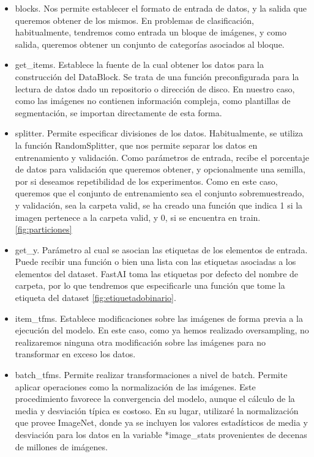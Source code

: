 \begin{itemize}
	\item blocks. Nos permite establecer el formato de entrada de datos, y la salida que queremos obtener de los mismos. En problemas de clasificación, habitualmente, tendremos como entrada un bloque de imágenes, y como salida, queremos obtener un conjunto de categorías asociados al bloque.
	\item get\_items. Establece la fuente de la cual obtener los datos para la construcción del DataBlock. Se trata de una función preconfigurada para la lectura de datos dado un repositorio o dirección de disco. En nuestro caso, como las imágenes no contienen información compleja, como plantillas de segmentación, se importan directamente de esta forma.
	\item splitter. Permite especificar divisiones de los datos. Habitualmente, se utiliza la función RandomSplitter, que nos permite separar los datos en entrenamiento y validación. Como parámetros de entrada, recibe el porcentaje de datos para validación que queremos obtener, y opcionalmente una semilla, por si deseamos repetibilidad de los experimentos. Como en este caso, queremos que el conjunto de entrenamiento sea el conjunto sobremuestreado, y validación, sea la carpeta valid, se ha creado una función que indica 1 si la imagen pertenece a la carpeta valid, y 0, si se encuentra en train. \ref{fig:particiones}
	\item get\_y. Parámetro al cual se asocian las etiquetas de los elementos de entrada. Puede recibir una función o bien una lista con las etiquetas asociadas a los elementos del dataset. FastAI toma las etiquetas por defecto del nombre de carpeta, por lo que tendremos que especificarle una función que tome la etiqueta del dataset \ref{fig:etiquetadobinario}.
	\item item\_tfms. Establece modificaciones sobre las imágenes de forma previa a la ejecución del modelo. En este caso, como ya hemos realizado oversampling, no realizaremos ninguna otra modificación sobre las imágenes para no transformar en exceso los datos.
	\item batch\_tfms. Permite realizar transformaciones a nivel de batch. Permite aplicar operaciones como la normalización de las imágenes. Este procedimiento favorece la convergencia del modelo, aunque el cálculo de la media y desviación típica es costoso. En su lugar, utilizaré la normalización que provee ImageNet, donde ya se incluyen los valores estadísticos de media y desviación para los datos en la variable *image\_stats provenientes de decenas de millones de imágenes.
	
\end{itemize}


